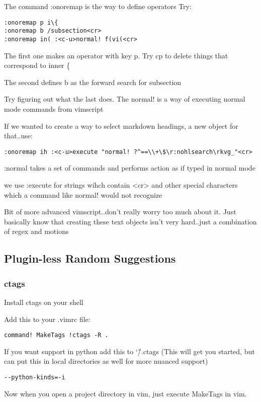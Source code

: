 \documentclass[12pt, letterpaper]{article}
\begin{document}
The command :onoremap is the way to define operators
Try:
\begin{verbatim}
:onoremap p i\{
:onoremap b /subsection<cr>
:onoremap in( :<c-u>normal! f(vi(<cr>
\end{verbatim}
The first one makes an operator with key p. Try cp to delete things that
correspond to inner \{

The second defines b as the forward search for subsection

Try figuring out what the last does. The normal! is a way of executing normal
mode commands from vimscript

If we wanted to create a way to select markdown headings, a new object for
that..use:
\begin{verbatim}
:onoremap ih :<c-u>execute "normal! ?^==\\+\$\r:nohlsearch\rkvg_"<cr>
\end{verbatim}

:normal takes a set of commands and performs action as if typed in normal mode

we use :execute for strings wihch contain <cr> and other special characters
which a command like normal! would not recognize

Bit of more advanced vimscript..don't really worry too much about it. Just
basically know that creating these text objects isn't very hard..just a
combination of regex and motions

\subsection{Plugin-less Random Suggestions}

\subsubsection{ctags}
Install ctags on your shell

Add this to your .vimrc file:
\begin{verbatim}
command! MakeTags !ctags -R .
\end{verbatim}

If you want support in python add this to \char`\~/.ctags (This will get you
started, but can put this in local directories as well for more nuanced
support)
\begin{verbatim}
--python-kinds=-i 
\end{verbatim}

Now when you open a project directory in vim, just execute MakeTags in vim.
\end{document}
